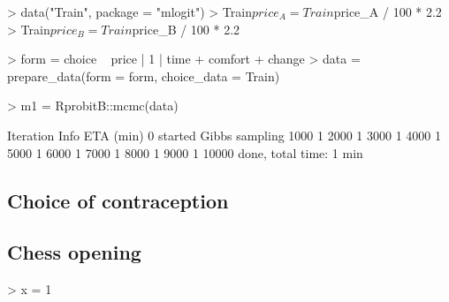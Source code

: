 \documentclass[article]{jss}
\begin{document}
%
\begin{Schunk}
\begin{Sinput}
> data("Train", package = "mlogit")
> Train$price_A = Train$price_A / 100 * 2.2
> Train$price_B = Train$price_B / 100 * 2.2
\end{Sinput}
\end{Schunk}
%

%
\begin{Schunk}
\begin{Sinput}
> form = choice ~ price | 1 | time + comfort + change
> data = prepare_data(form = form, choice_data = Train)
\end{Sinput}
\end{Schunk}
%

%
\begin{Schunk}
\begin{Sinput}
> m1 = RprobitB::mcmc(data)
\end{Sinput}
\begin{Soutput}
Iteration Info                   ETA (min)
        0 started Gibbs sampling          
     1000                                1
     2000                                1
     3000                                1
     4000                                1
     5000                                1
     6000                                1
     7000                                1
     8000                                1
     9000                                1
    10000 done, total time: 1 min
\end{Soutput}
\end{Schunk}
%

\subsection{Choice of contraception} \label{subsec:contraception}



\subsection{Chess opening} \label{subsec:chess}

%
\begin{Schunk}
\begin{Sinput}
> x = 1
\end{Sinput}
\end{Schunk}
%


\end{document}
